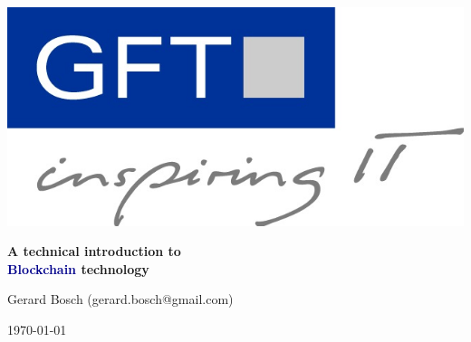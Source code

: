 \documentclass[notitlepage, usenames,dvipsnames]{beamer}
\begin{document}
    \begin{frame}
        \begin{center}
            
            
            \includegraphics[scale=0.15]{../img/gft.jpg}

            \vspace{1em}
            {\huge \bfseries \textcolor{MidnightBlue!100!bg}{ A technical introduction to\\[3mm] \textcolor{DarkBlue}{Blockchain} technology }} \\[3mm]

            \vspace{1em}{\Large\textcolor{red}{-- Preview Version --}}\vspace{-1em}

            \vspace{1cm}
            Gerard Bosch (gerard.bosch@gmail.com)

            \vspace{0.8cm}\today
        \end{center}
    \end{frame}



\end{document}
